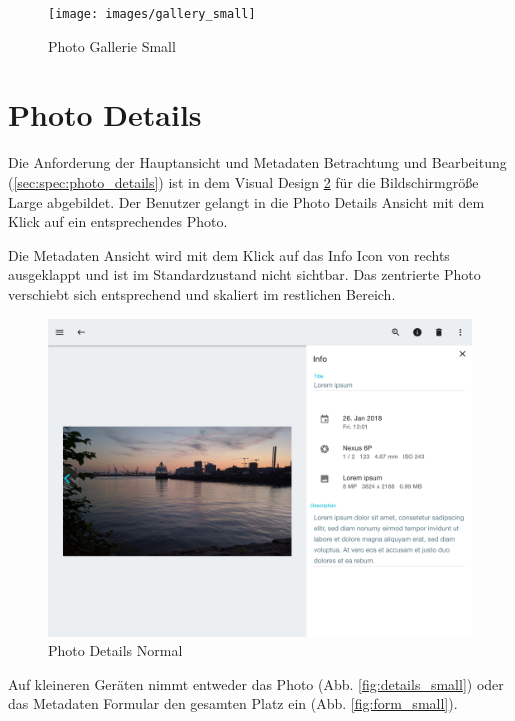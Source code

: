 \begin{figure}[htp]     %
\centering
\texttt{[image: images/gallery\_small]} 
\caption{Photo Gallerie Small}\label{fig:gallery_small}
\end{figure}

\section{Photo Details}
Die Anforderung der Hauptansicht und Metadaten Betrachtung und Bearbeitung (\ref{sec:spec:photo_details}) ist in dem Visual Design  \ref{fig:form_normal} für die Bildschirmgröße Large abgebildet. Der Benutzer gelangt in die Photo Details Ansicht mit dem Klick auf ein entsprechendes Photo. 

Die Metadaten Ansicht wird mit dem Klick auf das Info Icon von rechts ausgeklappt und ist im Standardzustand nicht sichtbar. Das zentrierte Photo verschiebt sich entsprechend und skaliert im restlichen Bereich.

\begin{figure}[htp]     %
\centering
\includegraphics[width=1.0\textwidth]{images/form_normal} 
\caption{Photo Details Normal}\label{fig:form_normal}
\end{figure}

Auf kleineren Geräten nimmt entweder das Photo (Abb. \ref{fig:details_small}) oder das Metadaten Formular den gesamten Platz ein (Abb. \ref{fig:form_small}).

